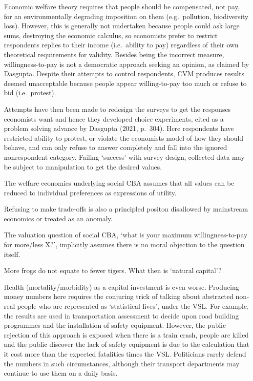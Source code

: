 \documentclass[
]{book}
\begin{document}
Economic welfare theory requires that people should be
compensated, not pay, for an environmentally degrading imposition on them (e.g.~pollution,
biodiversity loss). However, this is generally not undertaken because people could ask large sums,
destroying the economic calculus, so economists prefer to restrict respondents replies to their
income (i.e.~ability to pay) regardless of their own theoretical requirements for validity.
Besides being the incorrect measure, willingness-to-pay is not a democratic approach
seeking an opinion, as claimed by Dasgupta.
Despite their attempts to control respondents, CVM produces results
deemed unacceptable because people appear willing-to-pay too much or refuse to bid (i.e.~protest).

Attempts have then been made to redesign the surveys to get the responses economists want and
hence they developed choice experiments, cited as a problem solving advance by Dasgupta (2021,
p.~304). Here respondents have restricted ability to protest, or violate the economists model of
how they should behave, and can only refuse to answer completely and fall into the ignored
nonrespondent category. Failing `success' with survey design, collected data may be subject to
manipulation to get the desired values.

The welfare economics underlying social CBA assumes that all values can be reduced to individual
preferences as expressions of utility.

Refusing to make trade-offs is also a principled positon disallowed by
mainstream economics or treated as an anomaly.

The valuation question of social CBA, `what is your maximum willingness-to-pay for more/less
X?', implicitly assumes there is no moral objection to the question itself.

More frogs do not equate to fewer tigers.
What then is `natural capital'?

Health (mortality/morbidity) as a capital investment is even worse. Producing money numbers
here requires the conjuring trick of talking about abstracted non-real people who are represented as
`statistical lives', under the VSL. For example, the results are used in transportation assessment to
decide upon road building programmes and the installation of safety equipment. However, the
public rejection of this approach is exposed when there is a train crash, people are killed and the
public discover the lack of safety equipment is due to the calculation that it cost more than the
expected fatalities times the VSL. Politicians rarely defend the numbers in such circumstances,
although their transport departments may continue to use them on a daily basis.
\end{document}
